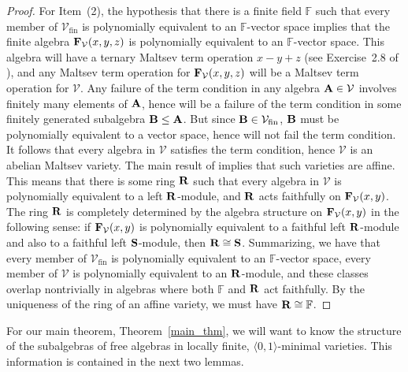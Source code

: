 \documentclass[12pt]{amsart}
\theoremstyle{definition}
\numberwithin{equation}{section}
\newcommand{\m}[1]{{\mathbf{\uppercase{#1}}}}
\begin{document}
\begin{proof}
For Item~(2), the hypothesis that   
there is a finite field $\mathbb{F}$ such that
  every member of $\mathcal{V}_{\textrm{fin}}$ is polynomially
  equivalent to an $\mathbb{F}$-vector space
  implies that the finite algebra
  $\m f_{\mathcal{V}}(x,y,z)$
  is polynomially
  equivalent to an $\mathbb{F}$-vector space.
  This algebra will have a ternary Maltsev
  term operation $x-y+z$ (see Exercise~2.8 of \cite{clones}),
  and any Maltsev term operation for
  $\m f_{\mathcal{V}}(x,y,z)$ will be a
  Maltsev term operation for $\mathcal{V}$.
  Any failure of the term condition in any
  algebra $\m a\in \mathcal{V}$ involves finitely
  many elements of $\m a$, hence will be a failure
  of the term condition in some finitely generated
  subalgebra $\m b\leq \m a$. But since
  $\m b\in \mathcal{V}_{\textrm{fin}}$,
  $\m b$ must be polynomially equivalent to a vector
  space, hence will not fail the term condition.
  It follows that every algebra in $\mathcal{V}$
  satisfies the term condition,
  hence $\mathcal{V}$ is an abelian Maltsev variety.
  The main result of \cite{herrmann} implies that 
  such varieties are affine.
  This means that there
  is some ring $\m r$ such that every
  algebra in $\mathcal{V}$ is polynomially
  equivalent to a left $\m r$-module, and
  $\m r$ acts faithfully on $\m f_{\mathcal{V}}(x,y)$.
  The ring $\m r$ is completely determined
  by the algebra structure on 
  $\m f_{\mathcal{V}}(x,y)$ in the following sense:
  if $\m f_{\mathcal{V}}(x,y)$ is polynomially
  equivalent to a faithful
  left $\m r$-module and also to a faithful left $\m s$-module,
  then $\m r\cong \m s$.
Summarizing, we have that
  every member of $\mathcal{V}_{\textrm{fin}}$ is polynomially
  equivalent to an $\mathbb{F}$-vector space,
  every member of $\mathcal{V}$ is polynomially
  equivalent to an $\m r$-module, and
  these classes overlap nontrivially in algebras
  where both $\mathbb{F}$ and $\m r$
  act faithfully. By the uniqueness of the
ring of an affine variety, we must have $\m r\cong \mathbb{F}$.
\end{proof}


For our main theorem, Theorem~\ref{main_thm}, we will want to know
the structure of the subalgebras of free algebras
in locally finite, $\langle 0,1\rangle$-minimal varieties.
This information is contained
in the next two lemmas.
\end{document}
